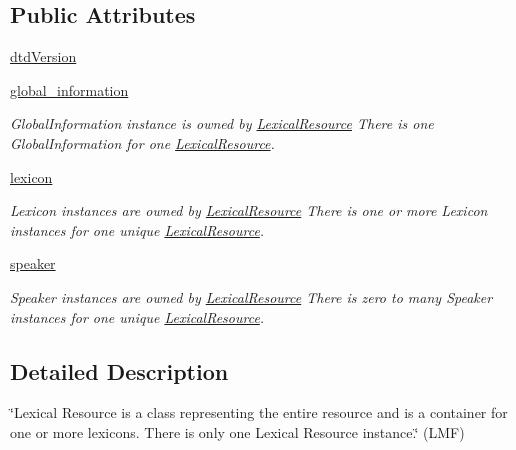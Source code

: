 \subsection*{Public Attributes}
\begin{DoxyCompactItemize}
\item 
\hyperlink{classlmf_1_1src_1_1core_1_1lexical__resource_1_1_lexical_resource_a2b48b5abc2a03ba17749f2e361f948fe}{dtd\+Version}
\item 
\hyperlink{classlmf_1_1src_1_1core_1_1lexical__resource_1_1_lexical_resource_a0d5cc63c48e3c5aa2bea6ad21c288e4f}{global\+\_\+information}
\begin{DoxyCompactList}\small\item\em Global\+Information instance is owned by \hyperlink{classlmf_1_1src_1_1core_1_1lexical__resource_1_1_lexical_resource}{Lexical\+Resource} There is one Global\+Information for one \hyperlink{classlmf_1_1src_1_1core_1_1lexical__resource_1_1_lexical_resource}{Lexical\+Resource}. \end{DoxyCompactList}\item 
\hyperlink{classlmf_1_1src_1_1core_1_1lexical__resource_1_1_lexical_resource_af4146645965f04411b37e8e52e7a04e0}{lexicon}
\begin{DoxyCompactList}\small\item\em Lexicon instances are owned by \hyperlink{classlmf_1_1src_1_1core_1_1lexical__resource_1_1_lexical_resource}{Lexical\+Resource} There is one or more Lexicon instances for one unique \hyperlink{classlmf_1_1src_1_1core_1_1lexical__resource_1_1_lexical_resource}{Lexical\+Resource}. \end{DoxyCompactList}\item 
\hyperlink{classlmf_1_1src_1_1core_1_1lexical__resource_1_1_lexical_resource_a378c5ca2854f818361547eee196d3497}{speaker}
\begin{DoxyCompactList}\small\item\em Speaker instances are owned by \hyperlink{classlmf_1_1src_1_1core_1_1lexical__resource_1_1_lexical_resource}{Lexical\+Resource} There is zero to many Speaker instances for one unique \hyperlink{classlmf_1_1src_1_1core_1_1lexical__resource_1_1_lexical_resource}{Lexical\+Resource}. \end{DoxyCompactList}\end{DoxyCompactItemize}


\subsection{Detailed Description}
\char`\"{}\+Lexical Resource is a class representing the entire resource and is a container for one or more lexicons. There is only one Lexical Resource instance.\char`\"{} (L\+M\+F) 

